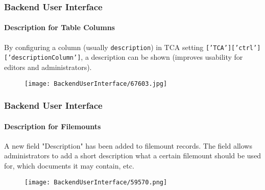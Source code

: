 \begin{frame}[fragile]
	\frametitle{Backend User Interface}
	\framesubtitle{Description for Table Columns}

	By configuring a column (usually \texttt{description}) in TCA setting \texttt{['TCA']['ctrl']['descriptionColumn']},
	a description can be shown (improves usability for editors and administrators).

	\begin{figure}
		\texttt{[image: BackendUserInterface/67603.jpg]}
	\end{figure}

\end{frame}

\begin{frame}[fragile]
	\frametitle{Backend User Interface}
	\framesubtitle{Description for Filemounts}

	A new field "Description" has been added to filemount records.
	The field allows administrators to add a short description what a certain filemount should be used for,
	which documents it may contain, etc.

	\begin{figure}
		\texttt{[image: BackendUserInterface/59570.png]}
	\end{figure}

\end{frame}

